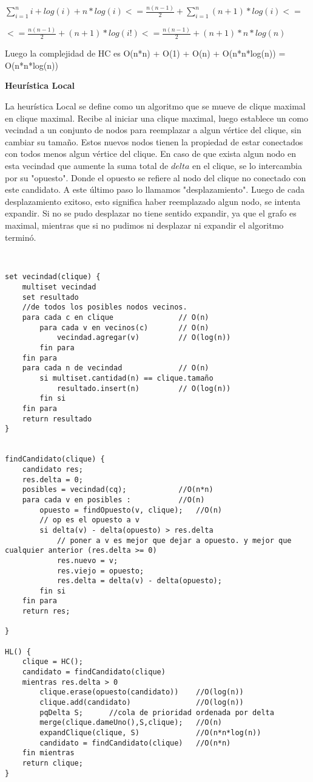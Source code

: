 $\displaystyle \sum_{i=1}^{n} i + log(i) + n*log(i) <= \frac{n(n-1)}{2}+\sum_{i=1}^{n} (n+1)*log(i) <=$  
 
$\displaystyle  <= \frac{n(n-1)}{2}+(n+1)*log(i!) <= \frac{n(n-1)}{2}+(n+1)*n*log(n) $

Luego la complejidad de HC es O(n*n) + O(1) + O(n) + O(n*n*log(n)) = O(n*n*log(n))  

\textbf{Heurística Local}

La heurística Local se define como un algoritmo que se mueve de clique maximal en clique maximal. Recibe al iniciar una clique maximal, luego establece un como vecindad a un conjunto de nodos para reemplazar a algun vértice del clique, sin cambiar su tamaño. Estos nuevos nodos tienen la propiedad de estar conectados con todos menos algun vértice del clique. En caso de que exista algun nodo en esta vecindad que aumente la suma total de $delta$ en el clique, se lo intercambia por su "opuesto". Donde el opuesto se refiere al nodo del clique no conectado con este candidato. A este último paso lo llamamos "desplazamiento". Luego de cada desplazamiento exitoso, esto significa haber reemplazado algun nodo, se intenta expandir. Si no se pudo desplazar no tiene sentido expandir, ya que el grafo es maximal, mientras que si no pudimos ni desplazar ni expandir el algoritmo terminó.


\begin{verbatim}


set vecindad(clique) {
    multiset vecindad
    set resultado
    //de todos los posibles nodos vecinos.
    para cada c en clique				// O(n)
		para cada v en vecinos(c)		// O(n)
			vecindad.agregar(v)			// O(log(n))
		fin para
	fin para
	para cada n de vecindad				// O(n)
		si multiset.cantidad(n) == clique.tamaño
			resultado.insert(n)			// O(log(n))
		fin si
	fin para
	return resultado
}


findCandidato(clique) {
	candidato res;
    res.delta = 0;
    posibles = vecindad(cq); 			//O(n*n)
    para cada v en posibles :			//O(n)
        opuesto = findOpuesto(v, clique);	//O(n)
        // op es el opuesto a v
        si delta(v) - delta(opuesto) > res.delta
			// poner a v es mejor que dejar a opuesto. y mejor que cualquier anterior (res.delta >= 0)
            res.nuevo = v;
            res.viejo = opuesto;
			res.delta = delta(v) - delta(opuesto);
        fin si
    fin para
    return res;

}

HL() {
	clique = HC();
	candidato = findCandidato(clique)
	mientras res.delta > 0
		clique.erase(opuesto(candidato))	//O(log(n))
		clique.add(candidato)				//O(log(n))
		pqDelta S; 		//cola de prioridad ordenada por delta
		merge(clique.dameUno(),S,clique);	//O(n)
		expandClique(clique, S)				//O(n*n*log(n))
		candidato = findCandidato(clique)	//O(n*n)			
	fin mientras
    return clique;
}
\end{verbatim}

